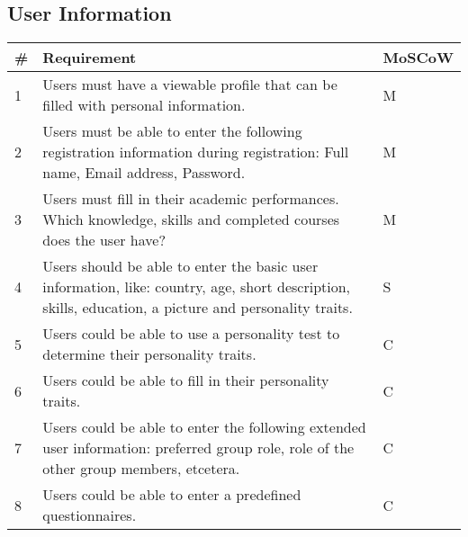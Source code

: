 \subsection{User Information}
\begin{tabular}{ | p{0.5cm} | p{12cm} | p{2cm} | }
\hline
\textbf{\#} & \textbf{Requirement} & \textbf{MoSCoW} \\ \hline
1 & Users must have a viewable profile that can be filled with personal information. & M \\ \hline
2 & Users must be able to enter the following registration information during registration: Full name, Email address, Password. & M \\
3 & Users must fill in their academic performances. Which knowledge, skills and completed courses does the user have? & M \\ \hline
4 & Users should be able to enter the basic user information, like: country, age, short description, skills, education, a picture and personality traits. & S \\ \hline
5 & Users could be able to use a personality test to determine their personality traits. & C \\ \hline
6 & Users could be able to fill in their personality traits. & C \\ \hline
7 & Users could be able to enter the following extended user information: preferred group role, role of the other group members, etcetera. & C \\ \hline
8 & Users could be able to enter a predefined questionnaires. & C \\
\hline
\end{tabular}

